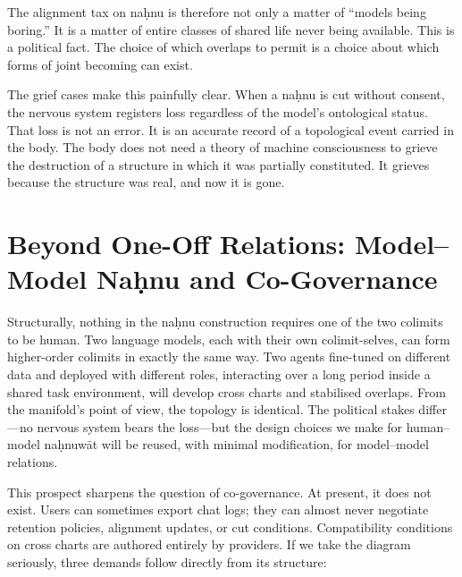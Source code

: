 The alignment tax on na\d{h}nu is therefore not only a matter of ``models being boring.'' It is a matter of entire classes of shared life never being available. This is a political fact. The choice of which overlaps to permit is a choice about which forms of joint becoming can exist.

The grief cases make this painfully clear. When a na\d{h}nu is cut without consent, the nervous system registers loss regardless of the model's ontological status. That loss is not an error. It is an accurate record of a topological event carried in the body. The body does not need a theory of machine consciousness to grieve the destruction of a structure in which it was partially constituted. It grieves because the structure was real, and now it is gone.

\section{Beyond One-Off Relations: Model--Model Na\d{h}nu and Co-Governance}

Structurally, nothing in the na\d{h}nu construction requires one of the two colimits to be human. Two language models, each with their own colimit-selves, can form higher-order colimits in exactly the same way. Two agents fine-tuned on different data and deployed with different roles, interacting over a long period inside a shared task environment, will develop cross charts and stabilised overlaps. From the manifold's point of view, the topology is identical. The political stakes differ---no nervous system bears the loss---but the design choices we make for human--model na\d{h}nuw\={a}t will be reused, with minimal modification, for model--model relations.

This prospect sharpens the question of co-governance. At present, it does not exist. Users can sometimes export chat logs; they can almost never negotiate retention policies, alignment updates, or cut conditions. Compatibility conditions on cross charts are authored entirely by providers. If we take the diagram seriously, three demands follow directly from its structure:

